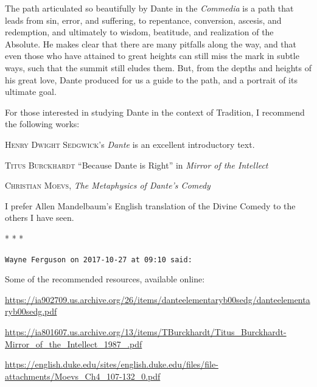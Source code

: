 The path articulated so beautifully by Dante in the \emph{Commedia} is a path that leads from sin, error, and suffering, to repentance, conversion, ascesis, and redemption, and ultimately to wisdom, beatitude, and realization of the Absolute. He makes clear that there are many pitfalls along the way, and that even those who have attained to great heights can still miss the mark in subtle ways, such that the summit still eludes them. But, from the depths and heights of his great love, Dante produced for us a guide to the path, and a portrait of its ultimate goal.

For those interested in studying Dante in the context of Tradition, I recommend the following works:

\textsc{Henry Dwight Sedgwick}'s \textit{Dante} is an excellent introductory text.

\textsc{Titus Burckhardt} ``Because Dante is Right'' in \textit{Mirror of the Intellect}

\textsc{Christian Moevs}, \textit{The Metaphysics of Dante's Comedy}

I prefer Allen Mandelbaum's English translation of the Divine Comedy to the others I have seen.



\begin{center}* * *\end{center}

\begin{footnotesize}
\begin{sffamily}

\texttt{Wayne Ferguson on 2017-10-27 at 09:10 said:}

Some of the recommended resources, available online:

\url{https://ia902709.us.archive.org/26/items/danteelementaryb00sedg/danteelementaryb00sedg.pdf}

\url{https://ia801607.us.archive.org/13/items/TBurckhardt/Titus\_Burckhardt-Mirror\_of\_the\_Intellect\_1987\_.pdf}

\url{https://english.duke.edu/sites/english.duke.edu/files/file-attachments/Moevs\_Ch4\_107-132\_0.pdf}

\hfill

\end{sffamily}
\end{footnotesize}

